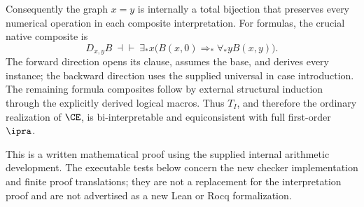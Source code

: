 Consequently the graph $x=y$ is internally a total bijection that
preserves every numerical operation in each composite interpretation.
For formulas, the crucial native composite is
\[
 D_{x,y}B\ \dashv\vdash\
 \exists_*x\bigl(B(x,0)\Rightarrow_*\forall_*y B(x,y)\bigr).
\]
The forward direction opens its clause, assumes the base, and derives
every instance; the backward direction uses the supplied universal in
case introduction. The remaining formula composites follow by external
structural induction through the explicitly derived logical macros.
Thus $T_I$, and therefore the ordinary realization of $\CE$, is
bi-interpretable and equiconsistent with full first-order $\ipra$.

This is a written mathematical proof using the supplied internal
arithmetic development. The executable tests below concern the new
checker implementation and finite proof translations; they are not a
replacement for the interpretation proof and are not advertised as a
new Lean or Rocq formalization.
